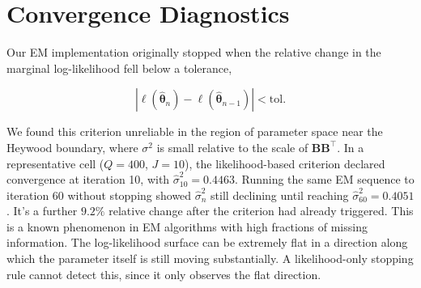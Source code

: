 \section{Convergence Diagnostics}
\label{sec:sim-convergence}

Our EM implementation originally stopped when the relative change in the marginal log-likelihood fell below a tolerance,

\begin{equation}
    \left| {\ell(\hat{\bm{\theta}}_{n}) - \ell(\hat{\bm{\theta}}_{n-1})} \right| < \mathrm{tol}.
\end{equation}

We found this criterion unreliable in the region of parameter space near the Heywood boundary, where $\sigma^2$ is small relative to the scale of $\mathbf{BB}^\top$. In a representative cell ($Q=400$, $J=10$), the likelihood-based criterion declared convergence at iteration 10, with $\hat\sigma_{10}^2 = 0.4463$. Running the same EM sequence to iteration 60 without stopping showed $\hat\sigma_{n}^2$ still declining until reaching $\hat\sigma_{60}^2=0.4051$. It's a further $9.2\%$ relative change after the criterion had already triggered. This is a known phenomenon in EM algorithms with high fractions of missing information. The log-likelihood surface can be extremely flat in a direction along which the parameter itself is still moving substantially. A likelihood-only stopping rule cannot detect this, since it only observes the flat direction.

